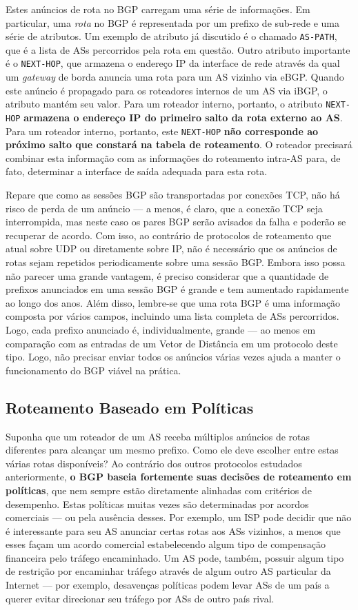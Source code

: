 \documentclass{article}
\begin{document}
Estes anúncios de rota no BGP carregam uma série de informações. Em particular, uma \textit{rota} no BGP é representada por um prefixo de sub-rede e uma série de atributos. Um exemplo de atributo já discutido é o chamado \texttt{AS-PATH}, que é a lista de ASs percorridos pela rota em questão. Outro atributo importante é o \texttt{NEXT-HOP}, que armazena o endereço IP da interface de rede através da qual um \textit{gateway} de borda anuncia uma rota para um AS vizinho via eBGP. Quando este anúncio é propagado para os roteadores internos de um AS via iBGP, o atributo mantém seu valor. Para um roteador interno, portanto, o atributo \texttt{NEXT-HOP} \textbf{armazena o endereço IP do primeiro salto da rota externo ao AS}. Para um roteador interno, portanto, este \texttt{NEXT-HOP} \textbf{não corresponde ao próximo salto que constará na tabela de roteamento}. O roteador precisará combinar esta informação com as informações do roteamento intra-AS para, de fato, determinar a interface de saída adequada para esta rota.

Repare que como as sessões BGP são transportadas por conexões TCP, não há risco de perda de um anúncio --- a menos, é claro, que a conexão TCP seja interrompida, mas neste caso os pares BGP serão avisados da falha e poderão se recuperar de acordo. Com isso, ao contrário de protocolos de roteamento que atual sobre UDP ou diretamente sobre IP, não é necessário que os anúncios de rotas sejam repetidos periodicamente sobre uma sessão BGP. Embora isso possa não parecer uma grande vantagem, é preciso considerar que a quantidade de prefixos anunciados em uma sessão BGP é grande e tem aumentado rapidamente ao longo dos anos. Além disso, lembre-se que uma rota BGP é uma informação composta por vários campos, incluindo uma lista completa de ASs percorridos. Logo, cada prefixo anunciado é, individualmente, grande --- ao menos em comparação com as entradas de um Vetor de Distância em um protocolo deste tipo. Logo, não precisar enviar todos os anúncios várias vezes ajuda a manter o funcionamento do BGP viável na prática.

\subsection{Roteamento Baseado em Políticas}

Suponha que um roteador de um AS receba múltiplos anúncios de rotas diferentes para alcançar um mesmo prefixo. Como ele deve escolher entre estas várias rotas disponíveis? Ao contrário dos outros protocolos estudados anteriormente, \textbf{o BGP baseia fortemente suas decisões de roteamento em políticas}, que nem sempre estão diretamente alinhadas com critérios de desempenho. Estas políticas muitas vezes são determinadas por acordos comerciais --- ou pela ausência desses. Por exemplo, um ISP pode decidir que não é interessante para seu AS anunciar certas rotas aos ASs vizinhos, a menos que esses façam um acordo comercial estabelecendo algum tipo de compensação financeira pelo tráfego encaminhado. Um AS pode, também, possuir algum tipo de restrição por encaminhar tráfego através de algum outro AS particular da Internet --- por exemplo, desavenças políticas podem levar ASs de um país a querer evitar direcionar seu tráfego por ASs de outro país rival.
\end{document}
